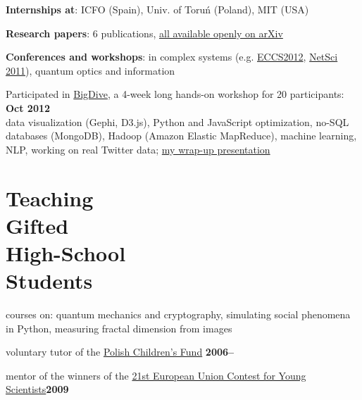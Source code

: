 \documentclass[margin,line]{resume}
\begin{document}
\begin{resume}
\begin{list2}
    \item {\bf Internships at}: ICFO (Spain), Univ. of Toruń (Poland), MIT (USA)
    
    \item {\bf Research papers}: 6 publications, \href{http://arxiv.org/a/migdal\_p\_1}{all available openly on arXiv}

    \item {\bf Conferences and workshops}: in complex systems (e.g. \href{http://www.eccs2012.eu/}{ECCS2012}, \href{http://netsci2011.net/}{NetSci 2011}), quantum optics and information

    \item Participated in \href{http://bigvide.eu}{BigDive}, a 4-week long hands-on workshop for 20 participants: \hfill {\bf Oct 2012}\\
        data visualization (Gephi, D3.js), Python and JavaScript optimization, no-SQL databases (MongoDB), Hadoop (Amazon Elastic MapReduce), machine learning, NLP, working on real Twitter data; \href{https://speakerdeck.com/pmigdal/a-map-of-256-tags-of-stackoverflow-at-bigdive-wrap-up}{my wrap-up presentation} 
    \end{list2}




    \section{\mysidestyle Teaching\\Gifted\\High-School\\Students}
    \begin{list2}
        \item courses on: quantum mechanics and cryptography, simulating social phenomena in Python, measuring fractal dimension from images
        \item voluntary tutor of the \href{http://www.fundusz.org/?lang=gb}{Polish Children's Fund} \hfill {\bf 2006--}
        \item mentor of the winners of the \href{http://www.eucys09.fr/}{21st European Union Contest for Young Scientists}\hfill {\bf 2009}
    \end{list2} 


\end{resume}
\end{document}
